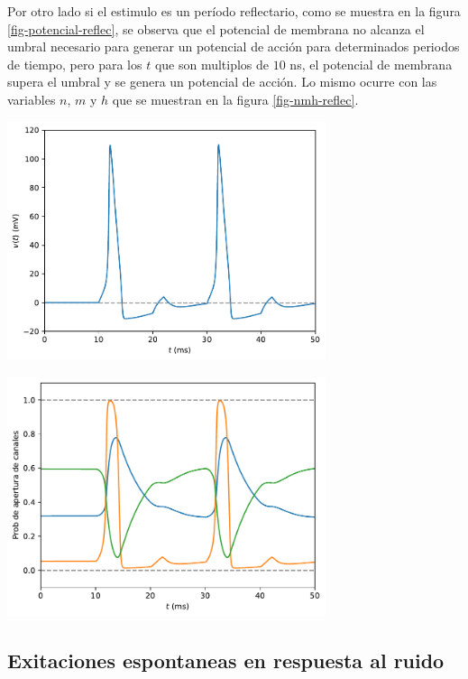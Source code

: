 \documentclass[aps,prl,reprint,groupedaddress]{revtex4-2}
\newenvironment{Figura}
  {\par\medskip\noindent\minipage{\linewidth}}
  {\endminipage\par\medskip}
\begin{document}
Por otro lado si el estimulo es un período reflectario, como se muestra en la
figura \ref{fig-potencial-reflec}, se observa que el potencial de membrana no 
alcanza el umbral necesario para generar un potencial de acción para determinados 
periodos de tiempo, pero para los $t$ que son multiplos de $10$ ns, el potencial
de membrana supera el umbral y se genera un potencial de acción. Lo mismo ocurre
con las variables $n$, $m$ y $h$ que se muestran en la figura \ref{fig-nmh-reflec}.
\begin{Figura}
    \centering
    \includegraphics[width=0.7\textwidth]{figs/potencial_reflectario.pdf}
    \label{fig-potencial-reflec}
\end{Figura}

\begin{Figura}
    \centering
    \includegraphics[width=0.7\textwidth]{figs/nmh_reflectario.pdf}
    \label{fig-nmh-reflec}
\end{Figura}

\subsection{Exitaciones espontaneas en respuesta al ruido}
\end{document}
